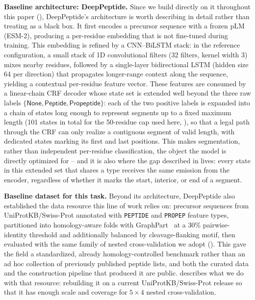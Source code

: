 \documentclass{article}
\begin{document}
\textbf{Baseline architecture: DeepPeptide.} Since we build directly on it throughout this paper (), DeepPeptide's architecture is worth describing in detail rather than treating as a black box. It first encodes a precursor sequence with a frozen pLM (ESM-2), producing a per-residue embedding that is not fine-tuned during training. This embedding is refined by a CNN--BiLSTM stack: in the reference configuration, a small stack of 1D convolutional filters (32 filters, kernel width 3) mixes nearby residues, followed by a single-layer bidirectional LSTM (hidden size 64 per direction) that propagates longer-range context along the sequence, yielding a contextual per-residue feature vector. These features are consumed by a linear-chain CRF decoder whose state set is extended well beyond the three raw labels $\{\textsf{None}, \textsf{Peptide}, \textsf{Propeptide}\}$: each of the two positive labels is expanded into a chain of states long enough to represent segments up to a fixed maximum length (101 states in total for the 50-residue cap used here, ), so that a legal path through the CRF can only realize a contiguous segment of valid length, with dedicated states marking its first and last positions. This makes segmentation, rather than independent per-residue classification, the object the model is directly optimized for -- and it is also where the gap described in  lives: every state in this extended set that shares a type receives the same emission from the encoder, regardless of whether it marks the start, interior, or end of a segment.

\textbf{Baseline dataset for this task.} Beyond its architecture, DeepPeptide also established the data resource this line of work relies on: precursor sequences from UniProtKB/Swiss-Prot annotated with \texttt{PEPTIDE} and \texttt{PROPEP} feature types, partitioned into homology-aware folds with GraphPart~\citep{graphpart2023} at a 30\% pairwise-identity threshold and additionally balanced by cleavage-flanking motif, then evaluated with the same family of nested cross-validation we adopt (). This gave the field a standardized, already homology-controlled benchmark rather than an ad hoc collection of previously published peptide lists, and both the curated data and the construction pipeline that produced it are public.  describes what we do with that resource: rebuilding it on a current UniProtKB/Swiss-Prot release so that it has enough scale and coverage for $5\times4$ nested cross-validation.
\end{document}

